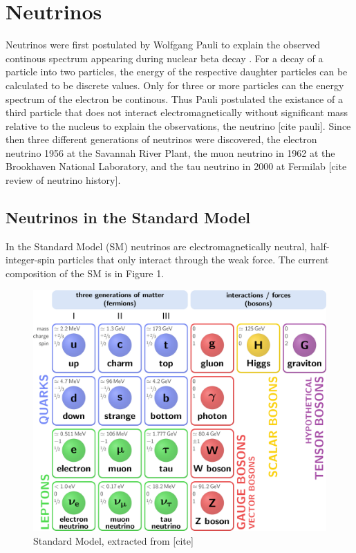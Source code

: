 \documentclass[a4paper,12pt,numbered]{article}
\begin{document}
\section{Neutrinos}

Neutrinos were first postulated by Wolfgang Pauli to explain the observed continous spectrum appearing during nuclear beta decay . For a decay of a particle into two particles, the energy of the respective daughter particles can be calculated to be discrete values. Only for three or more particles can the energy spectrum of the electron be continous. Thus Pauli postulated the existance of a third particle that does not interact electromagnetically without significant mass relative to the nucleus to explain the observations, the neutrino [cite pauli]. Since then three different generations of neutrinos were discovered, the electron neutrino 1956 at the Savannah River Plant, the muon neutrino in 1962 at the Brookhaven National Laboratory, and the tau neutrino in 2000 at Fermilab [cite review of neutrino history].

\subsection{Neutrinos in the Standard Model}

In the Standard Model (SM) neutrinos are electromagnetically neutral, half-integer-spin particles that only interact through the weak force. The current composition of the SM is in Figure 1.


\begin{figure}[H]
\begin{center}
\includegraphics[width=0.80 \textwidth]{Neutrino_Figures/SM.png}
\caption{Standard Model, extracted from [cite]}
\end{center}
\end{figure}
\end{document}
